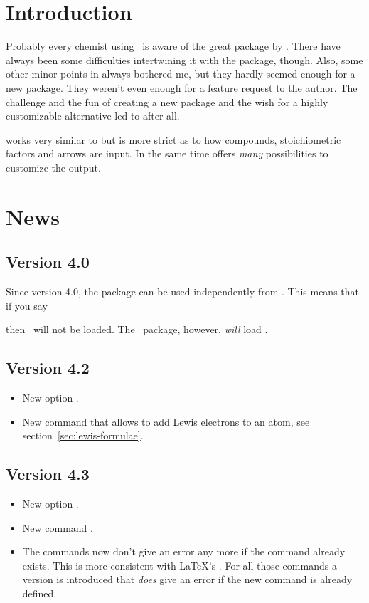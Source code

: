 \documentclass[load-preamble+]{cnltx-doc}
\begin{document}
\section{Introduction}
Probably every chemist using \LaTeXe\ is aware of the great 
package by \hensel.  There have always been some difficulties intertwining it
with the \chemmacros{} package, though.  Also, some other minor points in
 always bothered me, but they hardly seemed enough for a new
package.  They weren't even enough for a feature request to the 
author.  The challenge and the fun of creating a new package and the wish for
a highly customizable alternative led to \chemformula{} after all.

\chemformula{} works very similar to  but is more strict as to how
compounds, stoichiometric factors and arrows are input.  In the same time
\chemformula{} offers \emph{many} possibilities to customize the output.

\section{News}
\subsection{Version 4.0}
Since version 4.0, the \chemformula{} package can be used
independently from \chemmacros.  This means that if you say
\begin{sourcecode}
  \usepackage{chemformula}
\end{sourcecode}
then \chemmacros\ will not be loaded.  The \chemmacros\ package, however,
\emph{will} load \chemformula.

\subsection{Version 4.2}
\begin{itemize}
  \item New option .
  \item New command  that allows to add Lewis electrons to an
    atom, see section~\ref{sec:lewis-formulae}.
\end{itemize}

\subsection{Version 4.3}
\begin{itemize}
  \item New option .
  \item New command .
  \item The commands  now don't give an error any
    more if the command already exists.  This is more consistent with \LaTeX's
    .  For all those commands a version
     is introduced that \emph{does} give an error if
    the new command is already defined.
\end{itemize}
\end{document}

